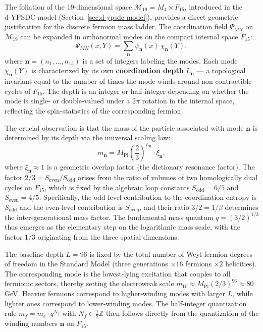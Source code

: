\documentclass[12pt,a4paper]{article}
\begin{document}
	The foliation of the 19‑dimensional space $\mathcal{M}_{19}=M_4\times F_{15}$,
	introduced in the d‑YPSDC model (Section~\ref{sec:d-ypsdc-model}), provides a
	direct geometric justification for the discrete fermion mass ladder. The
	coordination field $\Psi_{MN}$ on $\mathcal{M}_{19}$ can be expanded in
	orthonormal modes on the compact internal space $F_{15}$:
	\begin{equation}
		\Psi_{MN}(x,Y) = \sum_{\mathbf{n}} \psi_{\mathbf{n}}(x)\, \chi_{\mathbf{n}}(Y),
		\label{eq:mode-exp}
	\end{equation}
	where $\mathbf{n}=(n_1,\dots,n_{15})$ is a set of integers labeling the modes.
	Each mode $\chi_{\mathbf{n}}(Y)$ is characterized by its own \textbf{coordination
		depth} $L_{\mathbf{n}}$ — a topological invariant equal to the number of times
	the mode winds around non‑contractible cycles of $F_{15}$. The depth is an
	integer or half‑integer depending on whether the mode is single‑ or double‑valued
	under a $2\pi$ rotation in the internal space, reflecting the spin‑statistics of
	the corresponding fermion.
	
	The crucial observation is that the mass of the particle associated with mode
	$\mathbf{n}$ is determined by its depth via the universal scaling law:
	\begin{equation}
		m_{\mathbf{n}} = M_{\mathrm{Pl}} \left( \frac{2}{3} \right)^{L_{\mathbf{n}}} \cdot \xi_{\mathbf{n}},
		\label{eq:mass-L}
	\end{equation}
	where $\xi_{\mathbf{n}} \approx 1$ is a geometric overlap factor (the dictionary
	resonance factor). The factor $2/3 = S_{\mathrm{even}}/S_{\mathrm{odd}}$ arises
	from the ratio of volumes of two homologically dual cycles on $F_{15}$, which is
	fixed by the algebraic loop constants $S_{\mathrm{odd}}=6/5$ and
	$S_{\mathrm{even}}=4/5$. Specifically, the odd‑level contribution to the
	coordination entropy is $S_{\mathrm{odd}}$ and the even‑level contribution is
	$S_{\mathrm{even}}$, and their ratio $3/2 = 1/\beta$ determines the
	inter‑generational mass factor. The fundamental mass quantum $q =
	(3/2)^{1/3}$ thus emerges as the elementary step on the logarithmic mass scale,
	with the factor $1/3$ originating from the three spatial dimensions.
	
	The baseline depth $L=96$ is fixed by the total number of Weyl fermion degrees of
	freedom in the Standard Model (three generations $\times 16$ fermions $\times 2$
	helicities). The corresponding mode is the lowest‑lying excitation that couples
	to all fermionic sectors, thereby setting the electroweak scale
	$m_W \approx M_{\mathrm{Pl}} (2/3)^{96} \approx 80$ GeV. Heavier fermions
	correspond to higher‑winding modes with larger $L$, while lighter ones correspond
	to lower‑winding modes. The half‑integer quantization rule $m_f = m_e \cdot
	q^{N_f}$ with $N_f \in \frac{1}{2}\mathbb{Z}$ then follows directly from the
	quantization of the winding numbers $\mathbf{n}$ on $F_{15}$.
	
\end{document}
